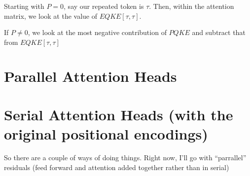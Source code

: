 Starting with $P = 0$, say our repeated token is $\tau$. Then, within the attention matrix, we look at the value of $EQKE[\tau, \tau]$. 

If $P \neq 0$, we look at the most negative contribution of $PQKE$ and subtract that from $EQKE[\tau, \tau]$

\section{Parallel Attention Heads}

\section{Serial Attention Heads (with the original positional encodings)}
So there are a couple of ways of doing things. Right now, I'll go with ``parrallel'' residuals (feed forward and attention added together rather than in serial)

%
%
%
%
%
%
%
%
%
%
%
%
%
%
%
%
%
%
%


